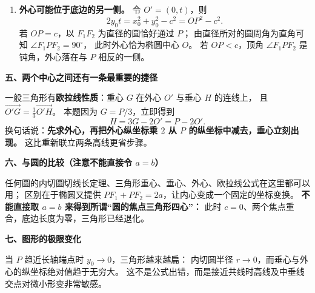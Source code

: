 \begin{explanationbox}
\begin{enumerate}
 \item \textbf{外心可能位于底边的另一侧。}
 令 $O'=(0,t)$，则
 \[
 2y_0t=x_0^2+y_0^2-c^2=OP^2-c^2.
 \]
 若 $OP=c$，以 $F_1F_2$ 为直径的圆恰好通过 $P$；
 由直径所对的圆周角为直角可知 $\angle F_1PF_2=90^\circ$，
 此时外心恰为椭圆中心 $O$。
 若 $OP<c$，顶角 $\angle F_1PF_2$ 是钝角，外心落在与 $P$ 相反的一侧。
\end{enumerate}

\textbf{五、两个中心之间还有一条最重要的捷径}

一般三角形有\textbf{欧拉线性质}：重心 $G$ 在外心 $O'$ 与垂心 $H$ 的连线上，
且 $\overrightarrow{O'G}=\tfrac13\overrightarrow{O'H}$。
本题因为 $G=P/3$，立即得到
\[
 H=3G-2O'=P-2O'.
\]
换句话说：\textbf{先求外心，再把外心纵坐标乘 $2$ 从 $P$ 的纵坐标中减去，垂心立刻出现。}
这比重新联立两条高线更省步骤。

\textbf{六、与圆的比较（注意不能直接令 $a=b$）}

任何圆的内切圆切线长定理、三角形重心、垂心、外心、欧拉线公式在这里都可以用；
区别在于椭圆又提供 $PF_1+PF_2=2a$，让内心变成一个固定的坐标变换。
\textbf{不能直接取 $a=b$ 来得到所谓“圆的焦点三角形四心”：}
此时 $c=0$、两个焦点重合，底边长度为零，三角形已经退化。

\textbf{七、图形的极限变化}

当 $P$ 趋近长轴端点时 $y_0\to0$，三角形越来越扁：
内切圆半径 $r\to0$，而垂心与外心的纵坐标绝对值趋于无穷大。
这不是公式出错，而是接近共线时高线及中垂线交点对微小形变非常敏感。
\end{explanationbox}
